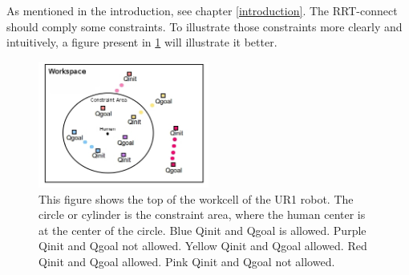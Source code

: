 As mentioned in the introduction, see chapter \ref{introduction}. The RRT-connect should comply some constraints. To illustrate those constraints more clearly and intuitively, a figure present in \ref{fig:humancenter} will illustrate it better.


\begin{figure}[htp]
  \centering
  \includegraphics[width=0.5\textwidth]{images/humancenter.jpg}
  \caption{This figure shows the top of the workcell of the UR1 robot. The circle or cylinder is the constraint area, where the human center is at the center of the circle. Blue Qinit and Qgoal is allowed. Purple Qinit and Qgoal not allowed. Yellow Qinit and Qgoal allowed. Red Qinit and Qgoal allowed. Pink Qinit and Qgoal not allowed.} 
  \label{fig:humancenter}
\end{figure}

